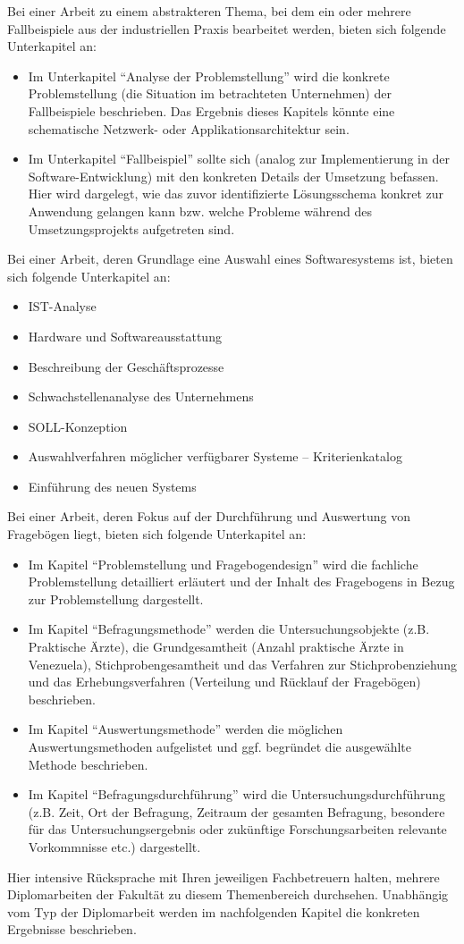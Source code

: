 Bei einer Arbeit zu einem abstrakteren Thema, bei dem ein oder mehrere Fallbeispiele aus der industriellen Praxis bearbeitet werden, bieten sich folgende Unterkapitel an:
\begin{itemize}
	\item Im Unterkapitel \enquote{Analyse der Problemstellung} wird die konkrete Problemstellung (die Situation im betrachteten Unternehmen) der Fallbeispiele beschrieben. Das Ergebnis dieses Kapitels könnte eine schematische Netzwerk- oder Applikationsarchitektur sein.
	\item Im Unterkapitel \enquote{Fallbeispiel} sollte sich (analog zur Implementierung in der Software-Entwicklung) mit den konkreten Details der Umsetzung befassen. Hier wird dargelegt, wie das zuvor identifizierte Lösungsschema konkret zur Anwendung gelangen kann bzw. welche Probleme während des Umsetzungsprojekts aufgetreten sind.
\end{itemize}

Bei einer Arbeit, deren Grundlage eine Auswahl eines Softwaresystems ist, bieten sich folgende Unterkapitel an:
\begin{itemize}
	\item IST-Analyse
	\item Hardware und Softwareausstattung
	\item Beschreibung der Geschäftsprozesse
	\item Schwachstellenanalyse des Unternehmens
	\item SOLL-Konzeption
	\item Auswahlverfahren möglicher verfügbarer Systeme -- Kriterienkatalog
	\item Einführung des neuen Systems
\end{itemize}

Bei einer Arbeit, deren Fokus auf der Durchführung und Auswertung von Fragebögen liegt, bieten sich folgende Unterkapitel an:
\begin{itemize}
	\item Im Kapitel \enquote{Problemstellung und Fragebogendesign} wird die fachliche Problemstellung detailliert erläutert und der Inhalt des Fragebogens in Bezug zur Problemstellung dargestellt.
	\item Im Kapitel \enquote{Befragungsmethode} werden die Untersuchungsobjekte (z.B. Praktische Ärzte), die Grundgesamtheit (Anzahl praktische Ärzte in Venezuela), Stichprobengesamtheit und das Verfahren zur Stichprobenziehung und das Erhebungsverfahren (Verteilung und Rücklauf der Fragebögen) beschrieben.
	\item Im Kapitel \enquote{Auswertungsmethode} werden die möglichen Auswertungsmethoden aufgelistet und ggf. begründet die ausgewählte Methode beschrieben.
	\item Im Kapitel \enquote{Befragungsdurchführung} wird die Untersuchungsdurchführung (z.B. Zeit, Ort der Befragung, Zeitraum der gesamten Befragung, besondere für das Untersuchungsergebnis oder zukünftige Forschungsarbeiten relevante Vorkommnisse etc.) dargestellt.
\end{itemize}

Hier intensive Rücksprache mit Ihren jeweiligen Fachbetreuern halten, mehrere Diplomarbeiten der Fakultät zu diesem Themenbereich durchsehen. Unabhängig vom Typ der Diplomarbeit werden im nachfolgenden Kapitel die konkreten Ergebnisse beschrieben.